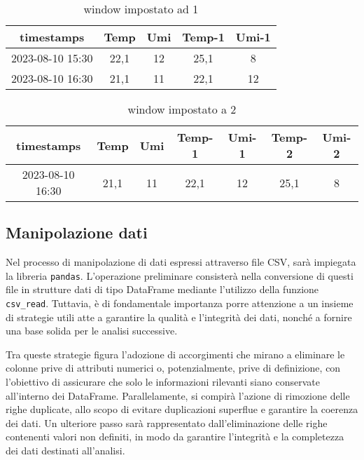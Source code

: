 \documentclass[a4paper,10pt]{article}
\begin{document}
\begin{table}[h]
  \begin{tabular}{|*{5}{c|}}
  
  \hline
  timestamps & Temp & Umi & Temp-1 & Umi-1\\
  \hline
  2023-08-10 15:30 & 22,1 & 12 & 25,1 & 8\\
  \hline
  2023-08-10 16:30 & 21,1 & 11 & 22,1 & 12\\
  \hline
  
  \end{tabular}
  
  \caption{window impostato ad 1}
\end{table}


\begin{table}[h]
  \begin{tabular}{|*{7}{c|}}
  \hline
  timestamps & Temp & Umi & Temp-1 & Umi-1 & Temp-2 & Umi-2\\
  \hline
  2023-08-10 16:30 & 21,1 & 11 & 22,1 & 12 & 25,1 & 8\\
  \hline
  
  \end{tabular}
  
  \caption{window impostato a 2}
\end{table}


\subsection{Manipolazione dati}
Nel processo di manipolazione di dati espressi attraverso file CSV, sarà impiegata la libreria  \texttt{pandas}. L'operazione preliminare 
consisterà nella conversione di questi file in strutture dati di tipo DataFrame mediante l'utilizzo della funzione  \texttt{csv\_read}. 
Tuttavia, è di fondamentale importanza porre attenzione a un insieme di strategie utili atte a garantire la qualità e l'integrità dei dati, 
nonché a fornire una base solida per le analisi successive.

Tra queste strategie figura l'adozione di accorgimenti che mirano a eliminare le colonne prive di attributi numerici o, potenzialmente, 
prive di definizione, con l'obiettivo di assicurare che solo le informazioni rilevanti siano conservate all'interno dei DataFrame. 
Parallelamente, si compirà l'azione di rimozione delle righe duplicate, allo scopo di evitare duplicazioni superflue e garantire la coerenza dei dati. 
Un ulteriore passo sarà rappresentato dall'eliminazione delle righe contenenti valori non definiti, in modo da garantire l'integrità e la completezza 
dei dati destinati all'analisi.
\end{document}
